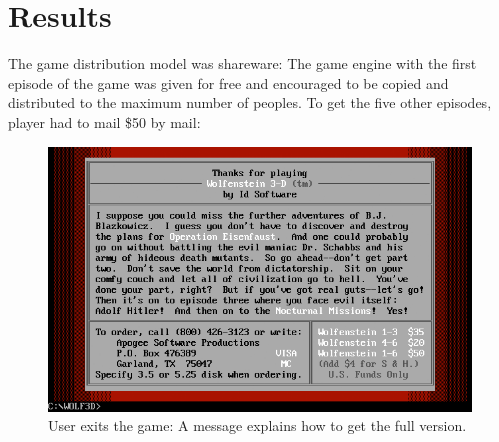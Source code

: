 \documentclass[book.tex]{subfiles}
\begin{document}
\section{Results}
The game distribution model was shareware: The game engine with the first episode of the game was given for free and encouraged to be copied and distributed to the maximum number of peoples. To get the five other episodes, player had to mail \$50 by mail:\\
\par
\begin{figure}[H]
\centering
 \includegraphics[width=\textwidth]{screenshots/shareware.png}
 \caption{User exits the game: A message explains how to get the full version.}
 \end{figure}
\end{document}
